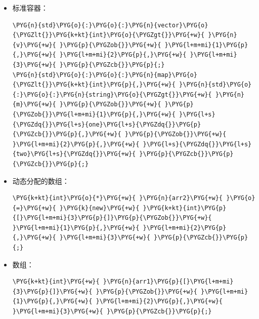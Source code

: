 \begin{itemize}
\item 标准容器：



\begin{codeblockbg}
\begin{Verbatim}[commandchars=\\\{\},breaklines=true,breakanywhere=true,fontsize=\codefont,xleftmargin=17bp]
\PYG{n}{std}\PYG{o}{:}\PYG{o}{:}\PYG{n}{vector}\PYG{o}{\PYGZlt{}}\PYG{k+kt}{int}\PYG{o}{\PYGZgt{}}\PYG{+w}{ }\PYG{n}{v}\PYG{+w}{ }\PYG{p}{\PYGZob{}}\PYG{+w}{ }\PYG{l+m+mi}{1}\PYG{p}{,}\PYG{+w}{ }\PYG{l+m+mi}{2}\PYG{p}{,}\PYG{+w}{ }\PYG{l+m+mi}{3}\PYG{+w}{ }\PYG{p}{\PYGZcb{}}\PYG{p}{;}
\PYG{n}{std}\PYG{o}{:}\PYG{o}{:}\PYG{n}{map}\PYG{o}{\PYGZlt{}}\PYG{k+kt}{int}\PYG{p}{,}\PYG{+w}{ }\PYG{n}{std}\PYG{o}{:}\PYG{o}{:}\PYG{n}{string}\PYG{o}{\PYGZgt{}}\PYG{+w}{ }\PYG{n}{m}\PYG{+w}{ }\PYG{p}{\PYGZob{}}\PYG{+w}{ }\PYG{p}{\PYGZob{}}\PYG{l+m+mi}{1}\PYG{p}{,}\PYG{+w}{ }\PYG{l+s}{\PYGZdq{}}\PYG{l+s}{one}\PYG{l+s}{\PYGZdq{}}\PYG{p}{\PYGZcb{}}\PYG{p}{,}\PYG{+w}{ }\PYG{p}{\PYGZob{}}\PYG{+w}{ }\PYG{l+m+mi}{2}\PYG{p}{,}\PYG{+w}{ }\PYG{l+s}{\PYGZdq{}}\PYG{l+s}{two}\PYG{l+s}{\PYGZdq{}}\PYG{+w}{ }\PYG{p}{\PYGZcb{}}\PYG{p}{\PYGZcb{}}\PYG{p}{;}
\end{Verbatim}
\end{codeblockbg}



\item 动态分配的数组：



\begin{codeblockbg}
\begin{Verbatim}[commandchars=\\\{\},breaklines=true,breakanywhere=true,fontsize=\codefont,xleftmargin=17bp]
\PYG{k+kt}{int}\PYG{o}{*}\PYG{+w}{ }\PYG{n}{arr2}\PYG{+w}{ }\PYG{o}{=}\PYG{+w}{ }\PYG{k}{new}\PYG{+w}{ }\PYG{k+kt}{int}\PYG{p}{[}\PYG{l+m+mi}{3}\PYG{p}{]}\PYG{p}{\PYGZob{}}\PYG{+w}{ }\PYG{l+m+mi}{1}\PYG{p}{,}\PYG{+w}{ }\PYG{l+m+mi}{2}\PYG{p}{,}\PYG{+w}{ }\PYG{l+m+mi}{3}\PYG{+w}{ }\PYG{p}{\PYGZcb{}}\PYG{p}{;}
\end{Verbatim}
\end{codeblockbg}



\item 数组：



\begin{codeblockbg}
\begin{Verbatim}[commandchars=\\\{\},breaklines=true,breakanywhere=true,fontsize=\codefont,xleftmargin=17bp]
\PYG{k+kt}{int}\PYG{+w}{ }\PYG{n}{arr1}\PYG{p}{[}\PYG{l+m+mi}{3}\PYG{p}{]}\PYG{+w}{ }\PYG{p}{\PYGZob{}}\PYG{+w}{ }\PYG{l+m+mi}{1}\PYG{p}{,}\PYG{+w}{ }\PYG{l+m+mi}{2}\PYG{p}{,}\PYG{+w}{ }\PYG{l+m+mi}{3}\PYG{+w}{ }\PYG{p}{\PYGZcb{}}\PYG{p}{;}
\end{Verbatim}
\end{codeblockbg}



\end{itemize}
